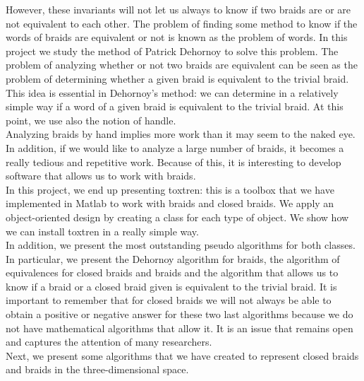 However, these invariants will not let us always to know if two braids are or are not equivalent to each other. The problem of finding some method to know if the words of braids are equivalent or not is known as the problem of words. In this project we study the method of Patrick Dehornoy to solve this problem. The problem of analyzing whether or not two braids are equivalent can be seen as the problem of determining whether a given braid is equivalent to the trivial braid. This idea is essential in Dehornoy's method: we can determine in a relatively simple way if a word of a given braid is equivalent to the trivial braid. At this point, we use also the notion of handle.\\








Analyzing braids by hand implies more work than it may seem to the naked eye. In addition, if we would like to analyze a large number of braids, it becomes a really tedious and repetitive work. Because of this, it is interesting to develop software that allows us to work with braids.\\








In this project, we end up presenting toxtren: this is a toolbox that we have implemented in Matlab to work with braids and closed braids. We apply an object-oriented design by creating a class for each type of object. We show how we can install toxtren in a really simple way.\\


In addition, we present the most outstanding pseudo algorithms for both classes. In particular, we present the Dehornoy algorithm for braids, the algorithm of equivalences for closed braids and braids and the algorithm that allows us to know if a braid or a closed braid given is equivalent to the trivial braid. It is important to remember that for closed braids we will not always be able to obtain a positive or negative answer for these two last algorithms because we do not have mathematical algorithms that allow it. It is an issue that remains open and captures the attention of many researchers.\\ Next, we present some algorithms that we have created to represent closed braids and braids in the three-dimensional space.\\





